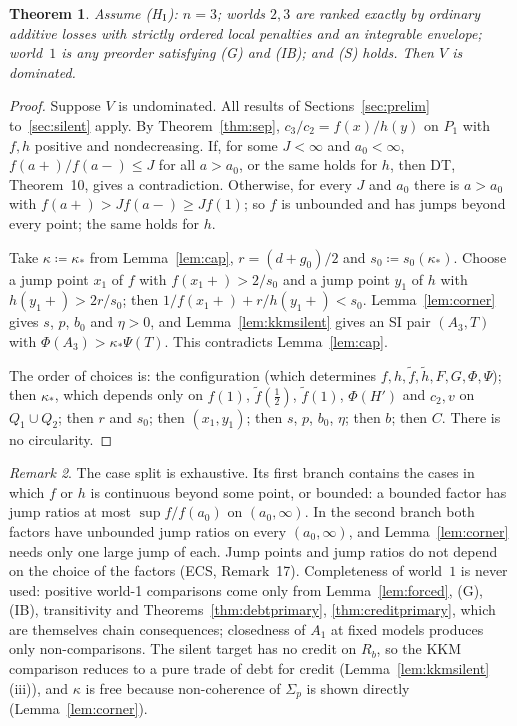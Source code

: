 \documentclass[11pt]{article}
\newtheorem{theorem}{Theorem}
\theoremstyle{definition}\newtheorem{definition}[theorem]{Definition}
\theoremstyle{remark}\newtheorem{remark}[theorem]{Remark}
\newcommand{\ftil}{\tilde f}
\newcommand{\htil}{\tilde h}
\begin{document}
\begin{theorem}\label{thm:I}
Assume (H$_{\rm I}$): $n=3$; worlds $2,3$ are ranked exactly by ordinary
additive losses with strictly ordered local penalties and an integrable
envelope; world~$1$ is any preorder satisfying (G) and (IB); and (S) holds.
Then $V$ is dominated.
\end{theorem}
\begin{proof}
Suppose $V$ is undominated. All results of Sections~\ref{sec:prelim}
to~\ref{sec:silent} apply. By Theorem~\ref{thm:sep}, $c_3/c_2=f(x)/h(y)$ on
$P_1$ with $f,h$ positive and nondecreasing. If, for some $J<\infty$ and
$a_0<\infty$, $f(a+)/f(a-)\le J$ for all $a>a_0$, or the same holds for $h$,
then DT, Theorem~10, gives a contradiction. Otherwise, for every $J$ and $a_0$
there is $a>a_0$ with $f(a+)>Jf(a-)\ge Jf(1)$; so $f$ is unbounded and has
jumps beyond every point; the same holds for $h$.

Take $\kappa\coloneqq\kappa_*$ from Lemma~\ref{lem:cap}, $r=(d+g_0)/2$ and
$s_0\coloneqq s_0(\kappa_*)$. Choose a jump point $x_1$ of $f$ with
$f(x_1+)>2/s_0$ and a jump point $y_1$ of $h$ with $h(y_1+)>2r/s_0$; then
$1/f(x_1+)+r/h(y_1+)<s_0$. Lemma~\ref{lem:corner} gives $s$, $p$, $b_0$ and
$\eta>0$, and Lemma~\ref{lem:kkmsilent} gives an SI pair $(A_3,T)$ with
$\Phi(A_3)>\kappa_*\Psi(T)$. This contradicts Lemma~\ref{lem:cap}.

The order of choices is: the configuration (which determines
$f,h,\ftil,\htil,F,G,\Phi,\Psi$); then $\kappa_*$, which depends only on
$f(1)$, $\ftil(\frac12)$, $\ftil(1)$, $\Phi(H')$ and $c_2,v$ on $Q_1\cup Q_2$;
then $r$ and $s_0$; then $(x_1,y_1)$; then $s$, $p$, $b_0$, $\eta$; then $b$;
then $C$. There is no circularity.
\end{proof}

\begin{remark}\label{rem:split}
The case split is exhaustive. Its first branch contains the cases in which
$f$ or $h$ is continuous beyond some point, or bounded: a bounded factor has
jump ratios at most $\sup f/f(a_0)$ on $(a_0,\infty)$. In the second branch
both factors have unbounded jump ratios on every $(a_0,\infty)$, and
Lemma~\ref{lem:corner} needs only one large jump of each. Jump points and
jump ratios do not depend on the choice of the factors (ECS, Remark~17).
Completeness of world~$1$ is never used: positive world-1 comparisons come
only from Lemma~\ref{lem:forced}, (G), (IB), transitivity and
Theorems~\ref{thm:debtprimary}, \ref{thm:creditprimary}, which are themselves
chain consequences; closedness of $A_1$ at fixed models produces only
non-comparisons. The silent target has no credit on $R_b$, so the KKM
comparison reduces to a pure trade of debt for credit
(Lemma~\ref{lem:kkmsilent}(iii)), and $\kappa$ is free because non-coherence
of $\Sigma_p$ is shown directly (Lemma~\ref{lem:corner}).
\end{remark}
\end{document}
